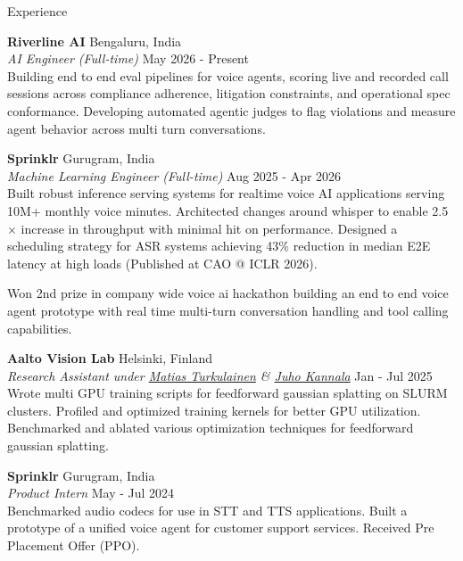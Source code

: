 \documentclass{resume}
\begin{document}
\begin{rSection}{Experience}
\vspace*{0.1in}

{\bf Riverline AI} {\hfill Bengaluru, India}\\
\textit{AI Engineer (Full-time)} \hfill May 2026 - Present\\
Building end to end eval pipelines for voice agents, scoring live and recorded call sessions across compliance adherence, litigation constraints, and operational spec conformance. Developing automated agentic judges to flag violations and measure agent behavior across multi turn conversations.

\vspace{0.15in}

{\bf Sprinklr} {\hfill Gurugram, India}\\
\textit{Machine Learning Engineer (Full-time)} \hfill Aug 2025 - Apr 2026\\
Built robust inference serving systems for realtime voice AI applications serving 10M+ monthly voice minutes. Architected changes around whisper to enable 2.5$\times$ increase in throughput with minimal hit on performance. Designed a scheduling strategy for ASR systems achieving 43\% reduction in median E2E latency at high loads (Published at CAO @ ICLR 2026).


Won 2nd prize in company wide voice ai hackathon building an end to end voice agent prototype with real time multi-turn conversation handling and tool calling capabilities.

\vspace{0.15in}

{\bf Aalto Vision Lab} {\hfill Helsinki, Finland}\\
\textit{Research Assistant under \href{https://maturk.github.io/}{Matias Turkulainen} \& \href{https://users.aalto.fi/~kannalj1/}{Juho Kannala}} \hfill Jan - Jul 2025\\
Wrote multi GPU training scripts for feedforward gaussian splatting on SLURM clusters. Profiled and optimized training kernels for better GPU utilization. Benchmarked and ablated various optimization techniques for feedforward gaussian splatting.

\vspace{0.15in}

{\bf Sprinklr} {\hfill Gurugram, India}\\
\textit{Product Intern} \hfill May - Jul 2024\\
Benchmarked audio codecs for use in STT and TTS applications. Built a prototype of a unified voice agent for customer support services. Received Pre Placement Offer (PPO).


\end{rSection}
\end{document}
